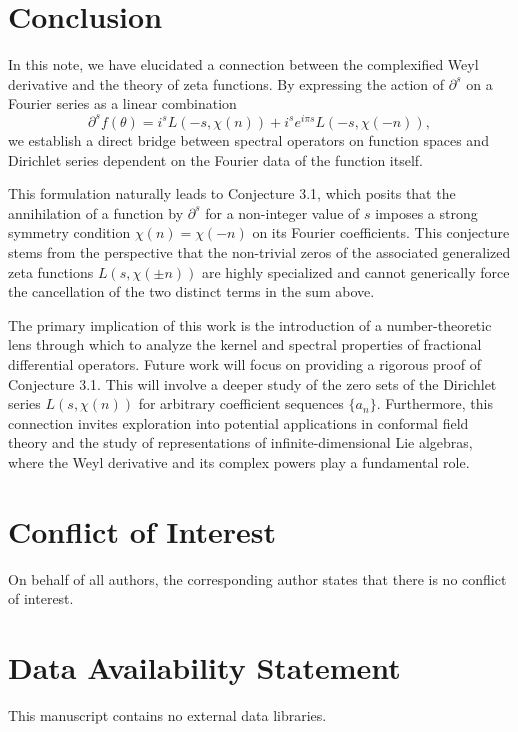 \documentclass{artjlt}
\newcommand{\?}{\textbackslash}
\begin{document}
\section{Conclusion}

In this note, we have elucidated a connection between the complexified Weyl derivative and the theory of zeta functions. By expressing the action of $\partial^s$ on a Fourier series as a linear combination
\[
\partial^{s}f(\theta) = i^{s}L(-s, \chi(n)) + i^{s}e^{i \pi s} L(-s, \chi(-n)),
\]
we establish a direct bridge between spectral operators on function spaces and Dirichlet series dependent on the Fourier data of the function itself.

This formulation naturally leads to Conjecture 3.1, which posits that the annihilation of a function by $\partial^s$ for a non-integer value of $s$ imposes a strong symmetry condition $\chi(n) = \chi(-n)$ on its Fourier coefficients. This conjecture stems from the perspective that the non-trivial zeros of the associated generalized zeta functions $L(s, \chi(\pm n))$ are highly specialized and cannot generically force the cancellation of the two distinct terms in the sum above.

The primary implication of this work is the introduction of a number-theoretic lens through which to analyze the kernel and spectral properties of fractional differential operators. Future work will focus on providing a rigorous proof of Conjecture 3.1. This will involve a deeper study of the zero sets of the Dirichlet series $L(s, \chi(n))$ for arbitrary coefficient sequences $\{a_n\}$. Furthermore, this connection invites exploration into potential applications in conformal field theory and the study of representations of infinite-dimensional Lie algebras, where the Weyl derivative and its complex powers play a fundamental role.
\section*{Conflict of Interest}
On behalf of all authors, the corresponding author states that there is no conflict of interest.
\section*{Data Availability Statement}
This manuscript contains no external data libraries.
\end{document}
